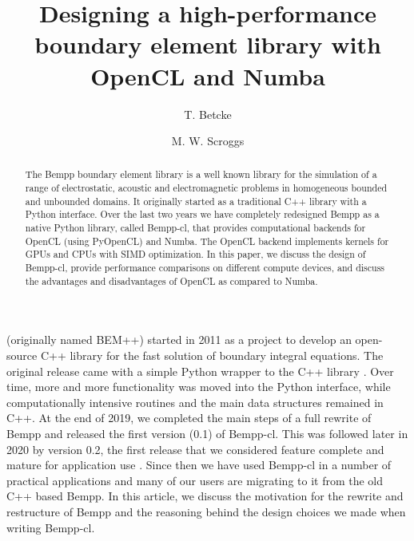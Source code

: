 \documentclass{IEEEcsmag}
\begin{document}

\title{Designing a high-performance boundary element library with OpenCL and Numba}

\author{T. Betcke}

\author{M. W. Scroggs}


\begin{abstract}
The Bempp boundary element library is a well known library for the simulation of a range of electrostatic, acoustic and electromagnetic problems in homogeneous bounded and unbounded domains. It originally started as a traditional C++ library with a Python interface. Over the last two years we have completely redesigned Bempp as a native Python library, called Bempp-cl, that provides computational backends for OpenCL (using PyOpenCL) and Numba. The OpenCL backend implements kernels for GPUs and CPUs with SIMD optimization. In this paper, we discuss the design of Bempp-cl, provide performance comparisons on different compute devices, and discuss the advantages and disadvantages of OpenCL as compared to Numba.
\end{abstract}

\maketitle

 (originally named BEM++) started in 2011 as a project to develop an open-source C++ library for the fast solution of boundary integral equations. The original release came with a simple Python wrapper to the C++ library \cite{bempp_orig}. Over time, more and more functionality was moved into the Python interface, while computationally intensive routines and the main data structures remained in C++.
At the end of 2019, we completed the main steps of a full rewrite of Bempp and released the first version (0.1) of Bempp-cl. This was followed later in 2020 by version 0.2, the first release that we considered feature complete and mature for application use \cite{Bempp-cl}. Since then we have used Bempp-cl in a number of practical applications and many of our users are migrating to it from the old C++ based Bempp. In this article, we discuss the motivation for the rewrite and restructure of Bempp and the reasoning behind the design choices we made when writing Bempp-cl.
\end{document}
